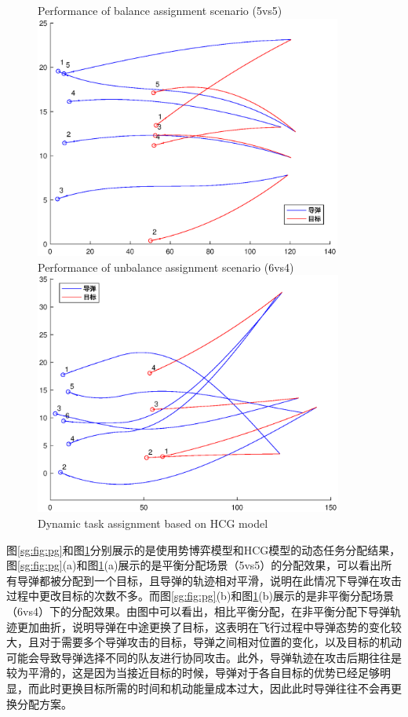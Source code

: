 \begin{figure}[!hbtp]
  \centering
                  {Performance of balance assignment scenario (5vs5)}%
                  {\includegraphics[height=8cm]{stochastic_game/HCG5vs5}}
                  {Performance of unbalance assignment scenario (6vs4)}%
                  {\includegraphics[height=8cm]{stochastic_game/HCG6vs4}}
            {Dynamic task assignment based on HCG model}
  \label{sg:fig:hcg}
\end{figure}

图\ref{sg:fig:pg}和图\ref{sg:fig:hcg}分别展示的是使用势博弈模型和HCG模型的动态任务分配结果，图\ref{sg:fig:pg}(a)和图\ref{sg:fig:hcg}(a)展示的是平衡分配场景（5vs5）的分配效果，可以看出所有导弹都被分配到一个目标，且导弹的轨迹相对平滑，说明在此情况下导弹在攻击过程中更改目标的次数不多。而图\ref{sg:fig:pg}(b)和图\ref{sg:fig:hcg}(b)展示的是非平衡分配场景（6vs4）下的分配效果。由图中可以看出，相比平衡分配，在非平衡分配下导弹轨迹更加曲折，说明导弹在中途更换了目标，这表明在飞行过程中导弹态势的变化较大，且对于需要多个导弹攻击的目标，导弹之间相对位置的变化，以及目标的机动可能会导致导弹选择不同的队友进行协同攻击。此外，导弹轨迹在攻击后期往往是较为平滑的，这是因为当接近目标的时候，导弹对于各自目标的优势已经足够明显，而此时更换目标所需的时间和机动能量成本过大，因此此时导弹往往不会再更换分配方案。

